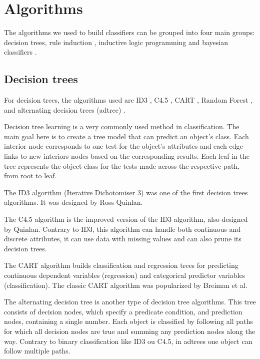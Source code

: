 \documentclass[a4paper]{llncs}
\begin{document}
\section{Algorithms} \label{sec:algs}

The algorithms we used to build classifiers can be grouped into four main
groups: decision trees, rule induction \cite{rule_induction},
inductive logic programming and bayesian classifiers \cite{bayes}.

\subsection{Decision trees}

For decision trees, the algorithms used are ID3 \cite{id3}, C4.5 \cite{c45}, CART \cite{cart},
Random Forest \cite{random_forest}, and alternating decision trees (adtree) \cite{adtree}.

Decision tree learning is a very commonly used method in classification. The main goal here is to
create a tree model that can predict an object's class. Each interior node corresponds
to one test for the object's attributes and each edge links to new interiors nodes based on the corresponding
results. Each leaf in the tree represents the object class for the tests made
across the respective path, from root to leaf.

The ID3 algorithm (Iterative Dichotomiser 3) was one of the first decision trees algorithms.
It was designed by Ross Quinlan.

The C4.5 algorithm is the improved version of the ID3 algorithm, also designed by Quinlan.
Contrary to ID3, this algorithm can handle both continuous and discrete attributes,
it can use data with missing values and can also prune its decision trees.

The CART algorithm builds classification and regression trees for predicting continuous dependent variables (regression)
and categorical predictor variables (classification). The classic CART algorithm was popularized by Breiman et al. \cite{cart}

The alternating decision tree is another type of decision tree algorithms. This tree
consists of decision nodes, which specify a predicate condition, and prediction nodes, containing a single number.
Each object is classified by following all paths for which all decision nodes are true and summing any
prediction nodes along the way. Contrary to binary classification like ID3 ou C4.5, in adtrees one
object can follow multiple paths. 
\end{document}
